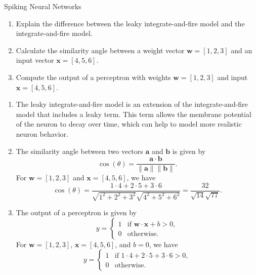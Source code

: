 \documentclass{article}
\begin{document}
\begin{exercise}{Spiking Neural Networks}
  \begin{enumerate}
    \item Explain the difference between the leaky integrate-and-fire model and the integrate-and-fire model.
    \item Calculate the similarity angle between a weight vector $\mathbf{w} = [1, 2, 3]$ and an input vector $\mathbf{x} = [4, 5, 6]$.
    \item Compute the output of a perceptron with weights $\mathbf{w} = [1, 2, 3]$ and input $\mathbf{x} = [4, 5, 6]$.
  \end{enumerate}

  \begin{solution}
    \begin{enumerate}
      \item The leaky integrate-and-fire model is an extension of the integrate-and-fire model that includes a leaky term. This term allows the membrane potential of the neuron to decay over time, which can help to model more realistic neuron behavior.
      \item The similarity angle between two vectors $\mathbf{a}$ and $\mathbf{b}$ is given by
      \[
        \cos(\theta) = \frac{\mathbf{a} \cdot \mathbf{b}}{\|\mathbf{a}\| \|\mathbf{b}\|}.
      \]
      For $\mathbf{w} = [1, 2, 3]$ and $\mathbf{x} = [4, 5, 6]$, we have
      \[
        \cos(\theta) = \frac{1 \cdot 4 + 2 \cdot 5 + 3 \cdot 6}{\sqrt{1^2 + 2^2 + 3^2} \sqrt{4^2 + 5^2 + 6^2}} = \frac{32}{\sqrt{14} \sqrt{77}}.
      \]
      \item The output of a perceptron is given by
      \[
        y = \begin{cases}
          1 & \text{if } \mathbf{w} \cdot \mathbf{x} + b > 0, \\
          0 & \text{otherwise}.
        \end{cases}
      \]
      For $\mathbf{w} = [1, 2, 3]$, $\mathbf{x} = [4, 5, 6]$, and $b = 0$, we have
      \[
        y = \begin{cases}
          1 & \text{if } 1 \cdot 4 + 2 \cdot 5 + 3 \cdot 6 > 0, \\
          0 & \text{otherwise}.
        \end{cases}
      \]
    \end{enumerate}
  \end{solution}
\end{exercise}
\end{document}

